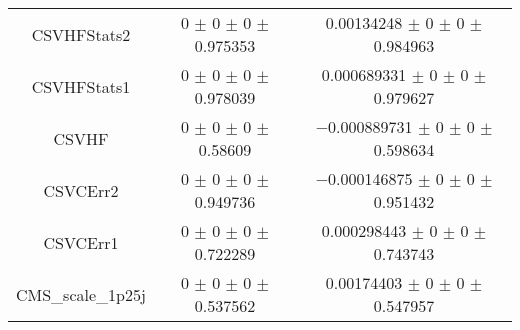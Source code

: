 \begin{table}
\begin{tabular}{ccc}
CSVHFStats2 	& \num{0} $\pm$ \num{0} $\pm$ \num{0} $\pm$ \num{0.975353} 	& \num{0.00134248} $\pm$ \num{0} $\pm$ \num{0} $\pm$ \num{0.984963}\\
CSVHFStats1 	& \num{0} $\pm$ \num{0} $\pm$ \num{0} $\pm$ \num{0.978039} 	& \num{0.000689331} $\pm$ \num{0} $\pm$ \num{0} $\pm$ \num{0.979627}\\
CSVHF 	& \num{0} $\pm$ \num{0} $\pm$ \num{0} $\pm$ \num{0.58609} 	& \num{-0.000889731} $\pm$ \num{0} $\pm$ \num{0} $\pm$ \num{0.598634}\\
CSVCErr2 	& \num{0} $\pm$ \num{0} $\pm$ \num{0} $\pm$ \num{0.949736} 	& \num{-0.000146875} $\pm$ \num{0} $\pm$ \num{0} $\pm$ \num{0.951432}\\
CSVCErr1 	& \num{0} $\pm$ \num{0} $\pm$ \num{0} $\pm$ \num{0.722289} 	& \num{0.000298443} $\pm$ \num{0} $\pm$ \num{0} $\pm$ \num{0.743743}\\
CMS\_scale\_1p25j 	& \num{0} $\pm$ \num{0} $\pm$ \num{0} $\pm$ \num{0.537562} 	& \num{0.00174403} $\pm$ \num{0} $\pm$ \num{0} $\pm$ \num{0.547957}\\
\bottomrule
\end{tabular}
\end{table}
